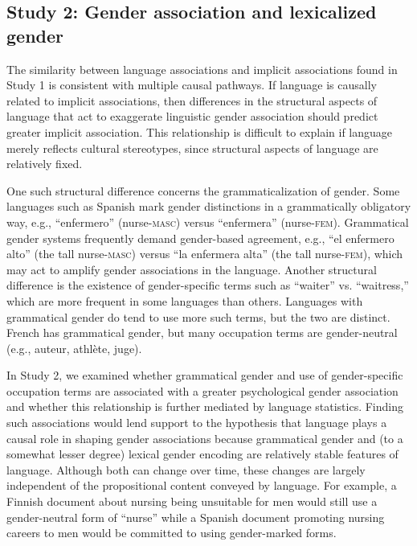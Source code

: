\documentclass[9pt,twocolumn]{pnas-new}
\begin{document}
\subsection*{Study 2: Gender association and lexicalized
gender}\label{study-2-gender-bias-and-lexicalized-gender}

The similarity between language associations and implicit associations found in Study 1 is consistent with multiple causal pathways. If language is causally related to implicit associations, then differences in the structural aspects of language that act to exaggerate linguistic gender association should predict greater implicit association. This relationship is difficult to explain if language merely reflects cultural stereotypes, since structural aspects of language are relatively fixed.

One such structural difference concerns the
grammaticalization of gender. Some languages such as Spanish mark gender
distinctions in a grammatically obligatory way, e.g.,
\enquote{enfermero} (nurse-\textsc{masc}) versus \enquote{enfermera}
(nurse-\textsc{fem}). Grammatical gender systems frequently demand
gender-based agreement, e.g., \enquote{el enfermero alto} (the tall
nurse-\textsc{masc}) versus \enquote{la enfermera alta} (the tall
nurse-\textsc{fem}), which may act to
amplify gender associations in the language. Another structural difference is the existence of gender-specific terms such as  \enquote{waiter} vs.
\enquote{waitress,} which are more frequent in some languages than others.  Languages with grammatical gender do tend to use
more such terms, but the two are distinct. French has grammatical
gender, but many occupation terms are gender-neutral (e.g., auteur,
athlète, juge).

In Study 2, we examined whether grammatical gender and use of
gender-specific occupation terms are associated with a greater
psychological gender association and whether this relationship is further
mediated by language statistics. Finding such associations would lend support to the hypothesis that language plays a causal role in shaping gender associations because grammatical gender and (to a somewhat lesser degree) lexical gender encoding are relatively stable features of language. Although both can change over time, these changes are largely independent of the propositional content conveyed by language. For example, a Finnish document about nursing being unsuitable for men would still use a gender-neutral form of
\enquote{nurse} while a Spanish document promoting nursing careers to
men would be committed to using gender-marked forms.
\end{document}
